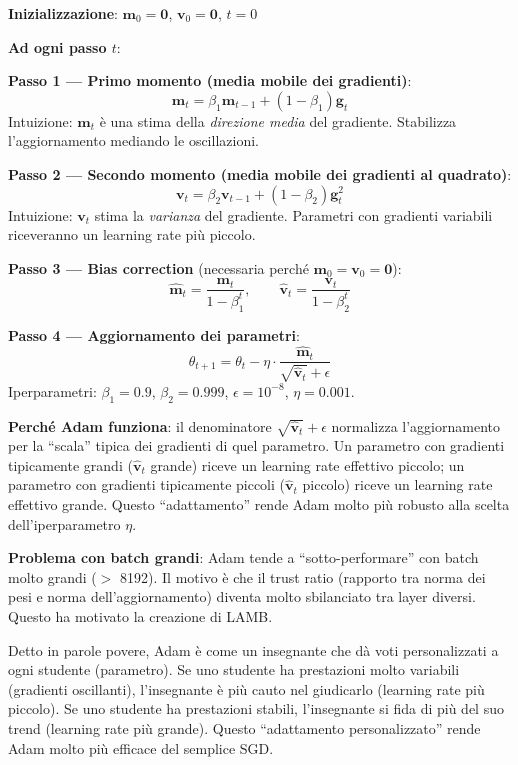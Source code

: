 \documentclass[12pt,a4paper]{article}
\begin{document}
\begin{formulabox}
\textbf{Inizializzazione}: $\mathbf{m}_0 = \mathbf{0}$, $\mathbf{v}_0 = \mathbf{0}$, $t = 0$

\textbf{Ad ogni passo $t$}:

\textbf{Passo 1 --- Primo momento (media mobile dei gradienti)}:
\[
    \mathbf{m}_t = \beta_1 \mathbf{m}_{t-1} + (1-\beta_1) \mathbf{g}_t
\]
Intuizione: $\mathbf{m}_t$ \`e una stima della \emph{direzione media} del gradiente. Stabilizza l'aggiornamento mediando le oscillazioni.

\textbf{Passo 2 --- Secondo momento (media mobile dei gradienti al quadrato)}:
\[
    \mathbf{v}_t = \beta_2 \mathbf{v}_{t-1} + (1-\beta_2) \mathbf{g}_t^2
\]
Intuizione: $\mathbf{v}_t$ stima la \emph{varianza} del gradiente. Parametri con gradienti variabili riceveranno un learning rate pi\`u piccolo.

\textbf{Passo 3 --- Bias correction} (necessaria perch\'e $\mathbf{m}_0 = \mathbf{v}_0 = \mathbf{0}$):
\[
    \hat{\mathbf{m}}_t = \frac{\mathbf{m}_t}{1 - \beta_1^t}, \qquad \hat{\mathbf{v}}_t = \frac{\mathbf{v}_t}{1 - \beta_2^t}
\]

\textbf{Passo 4 --- Aggiornamento dei parametri}:
\[
    \theta_{t+1} = \theta_t - \eta \cdot \frac{\hat{\mathbf{m}}_t}{\sqrt{\hat{\mathbf{v}}_t} + \epsilon}
\]
Iperparametri: $\beta_1 = 0.9$, $\beta_2 = 0.999$, $\epsilon = 10^{-8}$, $\eta = 0.001$.
\end{formulabox}

\textbf{Perch\'e Adam funziona}: il denominatore $\sqrt{\hat{\mathbf{v}}_t} + \epsilon$ normalizza l'aggiornamento per la ``scala'' tipica dei gradienti di quel parametro. Un parametro con gradienti tipicamente grandi ($\hat{\mathbf{v}}_t$ grande) riceve un learning rate effettivo piccolo; un parametro con gradienti tipicamente piccoli ($\hat{\mathbf{v}}_t$ piccolo) riceve un learning rate effettivo grande. Questo ``adattamento'' rende Adam molto pi\`u robusto alla scelta dell'iperparametro $\eta$.

\textbf{Problema con batch grandi}: Adam tende a ``sotto-performare'' con batch molto grandi ($>$ 8192). Il motivo \`e che il trust ratio (rapporto tra norma dei pesi e norma dell'aggiornamento) diventa molto sbilanciato tra layer diversi. Questo ha motivato la creazione di LAMB.

\begin{notabox}
Detto in parole povere, Adam \`e come un insegnante che d\`a voti personalizzati a ogni studente (parametro). Se uno studente ha prestazioni molto variabili (gradienti oscillanti), l'insegnante \`e pi\`u cauto nel giudicarlo (learning rate pi\`u piccolo). Se uno studente ha prestazioni stabili, l'insegnante si fida di pi\`u del suo trend (learning rate pi\`u grande). Questo ``adattamento personalizzato'' rende Adam molto pi\`u efficace del semplice SGD.
\end{notabox}
\end{document}

